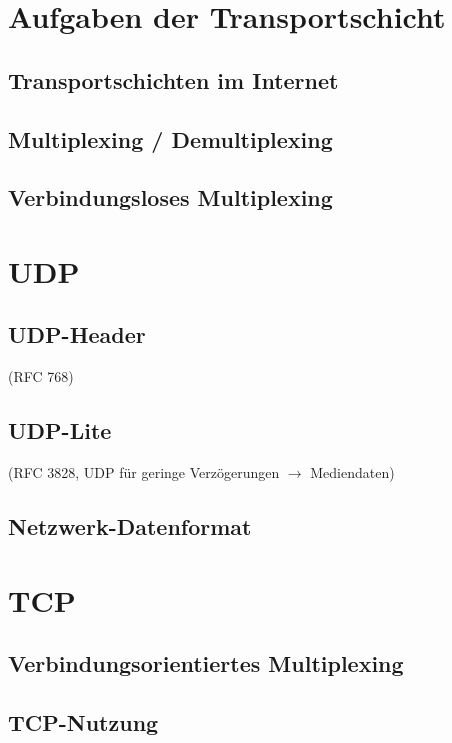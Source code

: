 \section{Aufgaben der Transportschicht}
\subsection{Transportschichten im Internet}
\subsection{Multiplexing / Demultiplexing}
\subsection{Verbindungsloses Multiplexing}
\section{UDP}
\subsection{UDP-Header}
(RFC 768)
\subsection{UDP-Lite}
(RFC 3828, UDP für geringe Verzögerungen $\to$ Mediendaten)

\subsection{Netzwerk-Datenformat}
\section{TCP}
\subsection{Verbindungsorientiertes Multiplexing}
\subsection{TCP-Nutzung}
